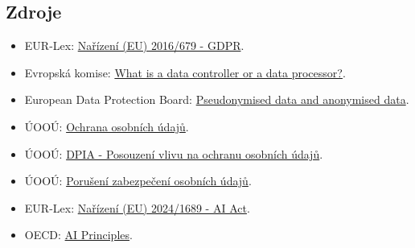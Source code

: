 \subsection{Zdroje}
\begin{itemize}
  \item EUR-Lex: \href{https://eur-lex.europa.eu/legal-content/CS/TXT/?uri=CELEX:32016R0679}{Nařízení (EU) 2016/679 - GDPR}.
  \item Evropská komise: \href{https://commission.europa.eu/law/law-topic/data-protection/rules-business-and-organisations/obligations/controllerprocessor/what-data-controller-or-data-processor_en}{What is a data controller or a data processor?}.
  \item European Data Protection Board: \href{https://www.edpb.europa.eu/sme-data-protection-guide/faq-frequently-asked-questions/answer/what-difference-between_en}{Pseudonymised data and anonymised data}.
  \item ÚOOÚ: \href{https://uoou.gov.cz/cinnost/ochrana-osobnich-udaju}{Ochrana osobních údajů}.
  \item ÚOOÚ: \href{https://uoou.gov.cz/profesional/qa-otazky-a-odpovedi/posouzeni-vlivu-na-ochranu-osobnich-udaju}{DPIA - Posouzení vlivu na ochranu osobních údajů}.
  \item ÚOOÚ: \href{https://uoou.gov.cz/profesional/poruseni-zabezpeceni-osobnich-udaju}{Porušení zabezpečení osobních údajů}.
  \item EUR-Lex: \href{https://eur-lex.europa.eu/legal-content/CS/TXT/?uri=CELEX:32024R1689}{Nařízení (EU) 2024/1689 - AI Act}.
  \item OECD: \href{https://www.oecd.org/en/topics/ai-principles.html}{AI Principles}.
\end{itemize}

\newpage
